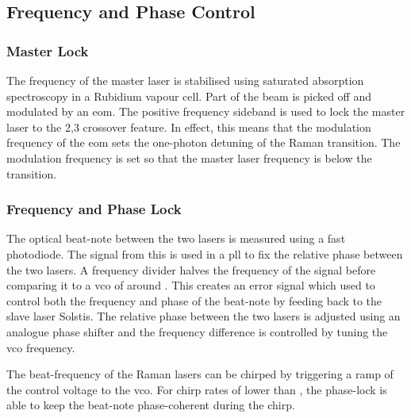 \subsection{Frequency and Phase Control}\label{subsec:msquared_control}

\subsubsection{Master Lock}
The frequency of the master laser is stabilised using saturated absorption
spectroscopy in a Rubidium vapour cell. Part of the beam is picked off and
modulated by an \ac{eom}. The positive frequency sideband is used to lock the
master laser to the 2,3 crossover feature. In effect, this means that the
modulation frequency of the \ac{eom} sets the one-photon detuning of the Raman
transition. The modulation frequency is set so that the master laser frequency
is  below the  transition.

\subsubsection{Frequency and Phase Lock} The optical beat-note between the two
lasers is measured using a fast photodiode. The signal from this is used in a
\ac{pll} to fix the relative phase between the two lasers. A frequency
divider halves the frequency of the signal before comparing it to a \ac{vco} of
around . This creates an error signal which used to
control both the frequency and phase of the beat-note by feeding back to the
slave laser Solstis. The relative phase between the two lasers is adjusted using
an analogue phase shifter and the frequency difference is controlled by tuning
the \ac{vco} frequency. \par\noindent The beat-frequency of the Raman lasers can
be chirped by triggering a ramp of the control voltage to the \ac{vco}. For
chirp rates of lower than , the phase-lock
is able to keep the beat-note phase-coherent during the chirp.  
